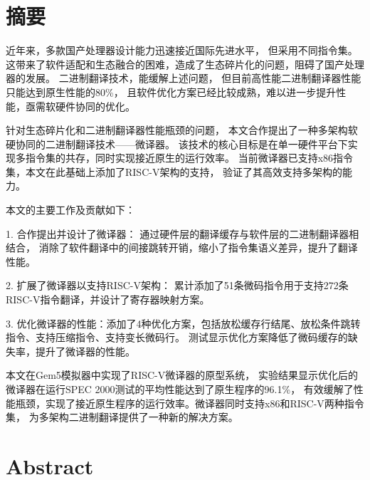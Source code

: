 \maketitle%
\MAKETITLE%
\makedeclaration%
\intobmk\chapter*{摘\quad 要}%
\setcounter{page}{1}%
近年来，多款国产处理器设计能力迅速接近国际先进水平，
但采用不同指令集。
这带来了软件适配和生态融合的困难，造成了生态碎片化的问题，阻碍了国产处理器的发展。
二进制翻译技术，能缓解上述问题，
但目前高性能二进制翻译器性能只能达到原生性能的80\%，
且软件优化方案已经比较成熟，难以进一步提升性能，亟需软硬件协同的优化。

针对生态碎片化和二进制翻译器性能瓶颈的问题，
本文合作提出了一种多架构软硬协同的二进制翻译技术——微译器。
该技术的核心目标是在单一硬件平台下实现多指令集的共存，同时实现接近原生的运行效率。
当前微译器已支持x86指令集，本文在此基础上添加了RISC-V架构的支持，
验证了其高效支持多架构的能力。

本文的主要工作及贡献如下：

1. 合作提出并设计了微译器：
通过硬件层的翻译缓存与软件层的二进制翻译器相结合，
消除了软件翻译中的间接跳转开销，缩小了指令集语义差异，提升了翻译性能。

2. 扩展了微译器以支持RISC-V架构：
累计添加了51条微码指令用于支持272条RISC-V指令翻译，并设计了寄存器映射方案。

3. 优化微译器的性能：添加了4种优化方案，包括放松缓存行结尾、放松条件跳转指令、支持压缩指令、支持变长微码行。
测试显示优化方案降低了微码缓存的缺失率，提升了微译器的性能。

本文在Gem5模拟器中实现了RISC-V微译器的原型系统，
实验结果显示优化后的微译器在运行SPEC 2000测试的平均性能达到了原生程序的96.1\%，
有效缓解了性能瓶颈，实现了接近原生程序的运行效率。微译器同时支持x86和RISC-V两种指令集，
为多架构二进制翻译提供了一种新的解决方案。

\intobmk\chapter*{Abstract}%

